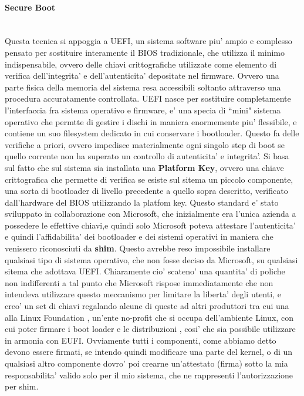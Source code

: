 \paragraph{Secure Boot}\\
Questa tecnica si appoggia a UEFI, un sistema software piu' ampio e complesso pensato per sostituire interamente il BIOS tradizionale, che utilizza il minimo indispensabile, ovvero delle chiavi crittografiche utilizzate come elemento di verifica dell'integrita' e dell'autenticita' depositate nel firmware. Ovvero una parte fisica della memoria del sistema resa accessibili soltanto attraverso una procedura accuratamente controllata. UEFI nasce per sostituire completamente l'interfaccia fra sistema operativo e firmware, e' una specia di ``mini" sistema operativo che permtte di gestire i dischi in maniera enormemente piu' flessibile, e contiene un suo filesystem dedicato in cui conservare i bootloader. Questo fa delle verifiche a priori, ovvero impedisce materialmente ogni singolo step di boot se quello corrente non ha superato un controllo di autenticita' e integrita'. Si basa sul fatto che sul sistema sia installata una \textbf{Platform Key}, ovvero una chiave crittografica che permette di verifica se esiste sul sitema un piccolo componente, una sorta di bootloader di livello precedente a quello sopra descritto, verificato dall'hardware del BIOS utilizzando la platfom key. Questo standard e' stato sviluppato in collaborazione con Microsoft, che inizialmente era l'unica azienda a possedere le effettive chiavi,e quindi solo Microsoft poteva attestare l'autenticita' e quindi l'affidabilita' dei bootloader e dei sistemi operativi in maniera che venissero riconosciuti da \textbf{shim}. Questo avrebbe reso impossibile installare qualsiasi tipo di sistema operativo, che non fosse deciso da Microsoft, su qualsiasi sitema che adottava UEFI. 
Chiaramente cio' scateno' una quantita' di poliche non indifferenti a tal punto che Microsoft rispose immediatamente che non intendeva utilizzare questo meccanismo per limitare la liberta' degli utenti, e creo' un set di chiavi regalando alcune di queste ad altri produttori tra cui una alla Linux Foundation , un'ente no-profit che si occupa dell'ambiente Linux, con cui poter firmare i boot loader e le distribuzioni , cosi' che sia possibile utilizzare in armonia con EUFI. Ovviamente tutti i componenti, come abbiamo detto devono essere firmati, se intendo quindi modificare una parte del kernel, o di un qualsiasi altro componente dovro' poi crearne un'attestato (firma) sotto la mia responsabilita' valido solo per il mio sistema, che ne rappresenti l'autorizzazione per shim. 
